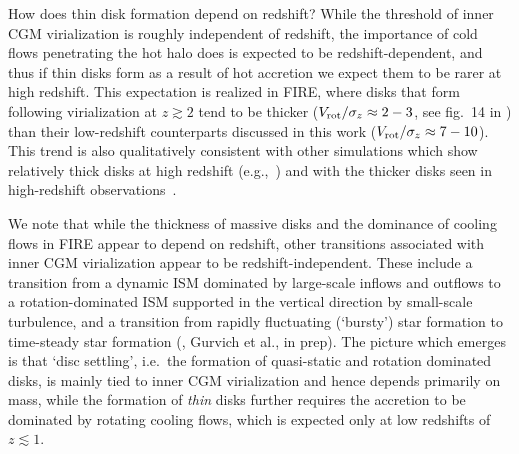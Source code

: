 \documentclass[fleqn,usenatbib]{mnras}
\begin{document}
How does thin disk formation depend on redshift?
While the threshold of inner CGM virialization is roughly independent of redshift, the importance of cold flows penetrating the hot halo does is expected to be redshift-dependent, and thus if thin disks form as a result of hot accretion we expect them to be rarer at high redshift.
This expectation is realized in FIRE, where disks that form following virialization at $z\gtrsim2$ tend to be thicker ($V_{\rm rot}/\sigma_z\approx2-3$, see fig.~14 in \citealt{Stern2021}) than their low-redshift counterparts discussed in this work ($V_{\rm rot}/\sigma_z\approx7-10$).
This trend is also qualitatively consistent with other simulations which show relatively thick disks at high redshift (e.g.,~\citealt{Pillepich2019, Dekel2019}) and with the thicker disks seen in high-redshift observations~\citep[e.g.][]{Tadaki2017}.

We note that while the thickness of massive disks and the dominance of cooling flows in FIRE appear to depend on redshift, other transitions  associated with inner CGM virialization appear to be redshift-independent.
These include a transition from a dynamic ISM dominated by large-scale inflows and outflows to a rotation-dominated ISM supported in the vertical direction by small-scale turbulence, and a transition from rapidly fluctuating (`bursty') star formation to time-steady star formation (\citealt{Stern2021, Yu2021}, Gurvich et al., in prep).  
The picture which emerges is that `disc settling', i.e.~the formation of quasi-static and rotation dominated disks, is mainly tied to inner CGM virialization and hence depends primarily on mass, while the formation of \textit{thin} disks further requires the accretion to be dominated by rotating cooling flows, which is expected only at low redshifts of $z\lesssim1$. 


\end{document}
